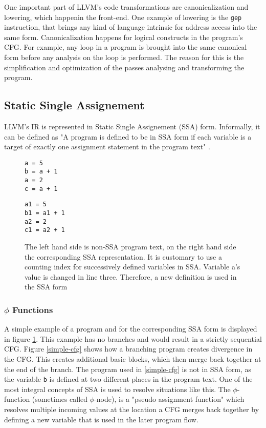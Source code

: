 One important part of LLVM's code transformations are canonicalization and lowering, which happenin the front-end. One example of lowering is the \verb|gep| instruction, that brings any kind of language intrinsic for address access into the same form. Canonicalization happens for logical constructs in the program's CFG. For example, any loop in a program is brought into the same canonical form before any analysis on the loop is performed.
The reason for this is the simplification and optimization of the passes analysing and transforming the program. 
\cite{llvm-passes}
\subsection{Static Single Assignement}
LLVM's IR is represented in Static Single Assignement (SSA) form. Informally, it can be defined as
"A program is defined to be in SSA form if each variable is a target of exactly one assignment
statement in the program text" \cite[p. 6]{Rastello:2016:SCD:3002539}.
\begin{figure}[t]
	\begin{minipage}{0.43\textwidth}	
\begin{lstlisting}[style=c]
a = 5
b = a + 1
a = 2
c = a + 1
\end{lstlisting}
	\end{minipage}\hfill
	\begin{minipage}{0.5\textwidth}
\begin{lstlisting}[style=c]
a1 = 5
b1 = a1 + 1
a2 = 2
c1 = a2 + 1
\end{lstlisting}
	\end{minipage}\hfill
	\caption[non-SSA vs. SSA code]{The left hand side is non-SSA program text, on the right hand side the corresponding SSA representation. It is customary to use a counting index for successively defined variables in SSA. Variable a's value is changed in line three. Therefore, a new definition is used in the SSA form}
	\label{simpleSSA}
\end{figure}
\subsubsection{$\phi$ Functions}
A simple example of a program and for the corresponding SSA form  is displayed in figure \ref{simpleSSA}.
This example has no branches and would result in a strictly sequential CFG.
Figure \ref{simple-cfg} shows how a branching program creates divergence in the CFG. This creates additional basic blocks,
which then merge back together at the end of the branch. The program used in \ref{simple-cfg} is not in SSA form, as the variable \verb|b| is defined at two different places in the program text. One of the most integral concepts of SSA is used to resolve situations like this.
The $\phi$-function (sometimes called $\phi$-node), is a "pseudo assignment function"\cite{ssabook} which resolves multiple incoming values
at the location a CFG merges back together by defining a new variable that is used in the later program flow.
\cite{Rastello:2016:SCD:3002539}

